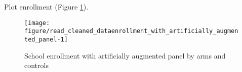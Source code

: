 Plot enrollment (\textsf{\small Figure \ref{Figure enrollment with artificially augmented panel}}).
\begin{Schunk}
\begin{figure}

{\centering \texttt{[image: figure/read\_cleaned\_dataenrollment\_with\_artificially\_augmented\_panel-1]} 

}

\caption[School enrollment with artificially augmented panel by arms and controls]{School enrollment with artificially augmented panel by arms and controls}\label{Figure enrollment with artificially augmented panel}
\end{figure}
\end{Schunk}



